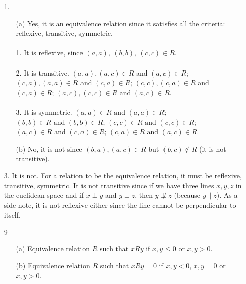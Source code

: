 \documentclass[12pt, a4paper]{article}
\begin{document}
\begin{itemize}
\item[1.]
\begin{itemize}
\item[(a)]
Yes, it is an equivalence relation since it satisfies all the criteria: reflexive, transitive, symmetric.\\\\
1. It is reflexive, since $(a, a), \ (b, b), \ (c, c) \in R$.\\\\
2. It is transitive. $(a, a), (a,c) \in R$ and $(a, c) \in R$; $(c, a), (a, a) \in R$ and $(c, a) \in R$;
$(c, c), (c, a) \in R$ and $(c, a) \in R$; $(a, c), (c, c) \in R$ and $(a, c) \in R$.\\\\
3. It is symmetric. $(a, a) \in R \mbox{ and } (a, a) \in R$; $(b, b) \in R \mbox{ and } (b, b) \in R$;
$(c, c) \in R \mbox{ and } (c, c) \in R$; $(a, c) \in R \mbox{ and } (c, a) \in R$; $(c, a) \in R \mbox{ and } (a, c) \in R$.

\item[]

\item[(b)]
No, it is not since $(b, a), (a, c) \in R$ but $(b, c) \notin R$ (it is not transitive).
\end{itemize}

\item[]
\item[]

\item[3.]
It is not. For a relation to be the equivalence relation, it must be reflexive, transitive, symmetric.
It is not transitive since if we have three lines $x, y, z$ in the euclidean space and if $x \perp y$ and $y \perp z$,
then $y \not\perp z$ (because $y \parallel z$). As a side note, it is not reflexive either since the line cannot be perpendicular to itself.

\item[]
\item[]

\item[9]
\begin{itemize}
\item[(a)]
Equivalence relation $R$ such that $x R y$ if $x, y \leq 0$ or $x, y > 0$.
\item[]

\item[(b)]
Equivalence relation $R$ such that $x R y = 0$ if $x, y < 0$, $x, y = 0$ or $x, y > 0$.
\end{itemize}


\end{itemize}
\end{document}
